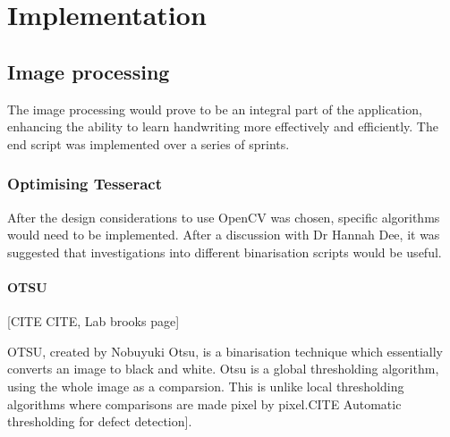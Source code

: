 \chapter{Implementation}




\section{Image processing}
The image processing would prove to be an integral part of the application, enhancing the ability to learn handwriting more effectively and efficiently. The end script was implemented over a series of sprints.
\subsection{Optimising Tesseract}
After the design considerations to use OpenCV was chosen, specific algorithms would need to be implemented. After a discussion with Dr Hannah Dee, it was suggested that investigations into different binarisation scripts would be useful.

\subsubsection{OTSU}
[CITE CITE, Lab brooks page]

OTSU, created by Nobuyuki Otsu, is a binarisation technique which essentially converts an image to black and white. Otsu is a global thresholding algorithm, using the whole image as a comparsion. This is unlike local thresholding algorithms where comparisons are made pixel by pixel.CITE Automatic thresholding for defect detection].

